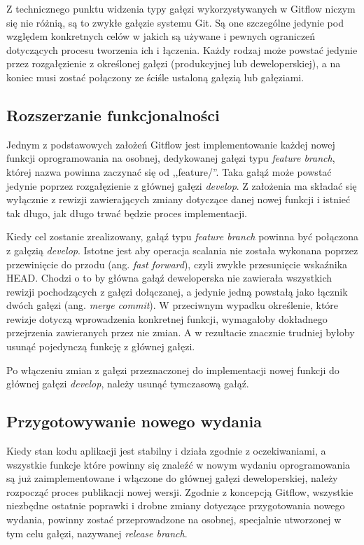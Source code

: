 \documentclass[11pt,a4paper,polish,thesis]{dcsbook}
\begin{document}
	Z technicznego punktu widzenia typy gałęzi wykorzystywanych w Gitflow niczym się nie różnią, są to zwykłe gałęzie systemu Git. Są one szczególne jedynie pod względem konkretnych celów w jakich są używane i pewnych ograniczeń dotyczących procesu tworzenia ich i łączenia. Każdy rodzaj może powstać jedynie przez rozgałęzienie z określonej gałęzi (produkcyjnej lub deweloperskiej), a na koniec musi zostać połączony ze ściśle ustaloną gałęzią lub gałęziami.
	
	\subsection{Rozszerzanie funkcjonalności}
	
	Jednym z podstawowych założeń Gitflow jest implementowanie każdej nowej funkcji oprogramowania na osobnej, dedykowanej gałęzi typu \textit{feature branch}, której nazwa powinna zaczynać się od ,,feature/''. Taka gałąź może powstać jedynie poprzez rozgałęzienie z głównej gałęzi \textit{develop}. Z założenia ma składać się wyłącznie z rewizji zawierających zmiany dotyczące danej nowej funkcji i istnieć tak długo, jak długo trwać będzie proces implementacji.
	
	Kiedy cel zostanie zrealizowany, gałąź typu \textit{feature branch} powinna być połączona z gałęzią \textit{develop}. Istotne jest aby operacja scalania nie została wykonana poprzez przewinięcie do przodu (ang. \textit{fast forward}), czyli zwykłe przesunięcie wskaźnika HEAD. Chodzi o to by główna gałąź deweloperska nie zawierała wszystkich rewizji pochodzących z gałęzi dołączanej, a jedynie jedną powstałą jako łącznik dwóch gałęzi (ang. \textit{merge commit}). W przeciwnym wypadku określenie, które rewizje dotyczą wprowadzenia konkretnej funkcji, wymagałoby dokładnego przejrzenia zawieranych przez nie zmian. A w rezultacie znacznie trudniej byłoby usunąć pojedynczą funkcję z głównej gałęzi. 
	
	Po włączeniu zmian z gałęzi przeznaczonej do implementacji nowej funkcji do głównej gałęzi \textit{develop}, 
	należy usunąć tymczasową gałąź.
	
	\subsection{Przygotowywanie nowego wydania}
	
	Kiedy stan kodu aplikacji jest stabilny i działa zgodnie z oczekiwaniami, a wszystkie funkcje które powinny się znaleźć w nowym wydaniu oprogramowania są już zaimplementowane i włączone do głównej gałęzi deweloperskiej, należy rozpocząć proces publikacji nowej wersji. Zgodnie z koncepcją Gitflow, wszystkie niezbędne ostatnie poprawki i drobne zmiany dotyczące przygotowania nowego wydania, powinny zostać przeprowadzone na osobnej, specjalnie utworzonej w tym celu gałęzi, nazywanej \textit{release branch}.
	
\end{document}
